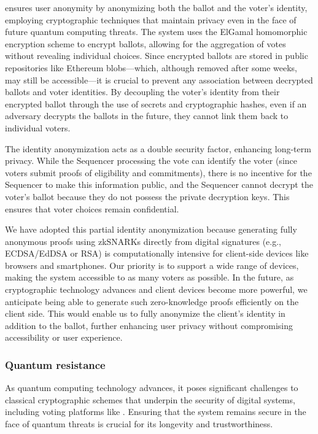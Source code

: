 \Davinci ensures user anonymity by anonymizing both the ballot and the voter's identity, employing cryptographic techniques that maintain privacy even in the face of future quantum computing threats. The system uses the ElGamal homomorphic encryption scheme to encrypt ballots, allowing for the aggregation of votes without revealing individual choices. Since encrypted ballots are stored in public repositories like Ethereum blobs—which, although removed after some weeks, may still be accessible—it is crucial to prevent any association between decrypted ballots and voter identities. By decoupling the voter's identity from their encrypted ballot through the use of secrets and cryptographic hashes, even if an adversary decrypts the ballots in the future, they cannot link them back to individual voters.

The identity anonymization acts as a double security factor, enhancing long-term privacy. While the Sequencer processing the vote can identify the voter (since voters submit proofs of eligibility and commitments), there is no incentive for the Sequencer to make this information public, and the Sequencer cannot decrypt the voter's ballot because they do not possess the private decryption keys. This ensures that voter choices remain confidential.

We have adopted this partial identity anonymization because generating fully anonymous proofs using zkSNARKs directly from digital signatures (e.g., ECDSA/EdDSA or RSA) is computationally intensive for client-side devices like browsers and smartphones. Our priority is to support a wide range of devices, making the system accessible to as many voters as possible. In the future, as cryptographic technology advances and client devices become more powerful, we anticipate being able to generate such zero-knowledge proofs efficiently on the client side. This would enable us to fully anonymize the client's identity in addition to the ballot, further enhancing user privacy without compromising accessibility or user experience.

\subsubsection{Quantum resistance}

As quantum computing technology advances, it poses significant challenges to classical cryptographic schemes that underpin the security of digital systems, including voting platforms like \davinci. Ensuring that the system remains secure in the face of quantum threats is crucial for its longevity and trustworthiness.


